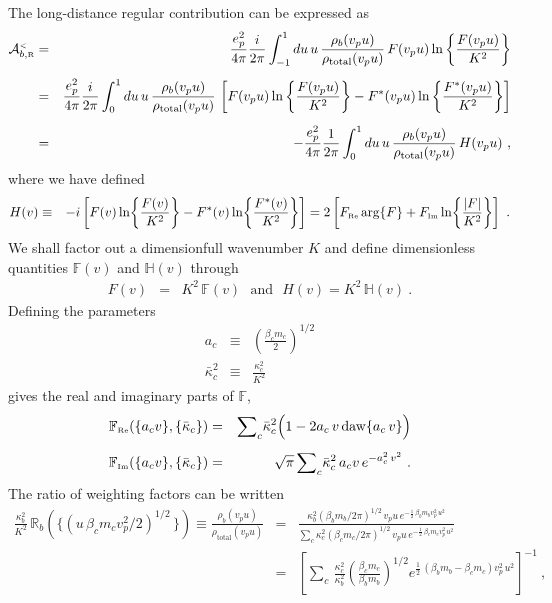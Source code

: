 \documentclass[preprint,12pt,eqsecnum,nofootinbib,amsmath,amssymb]{revtex4}
\newcommand{\smR}{{\rm\scriptscriptstyle R}}
\newcommand{\smRe}{{\rm\scriptscriptstyle Re}}
\newcommand{\smIm}{{\rm\scriptscriptstyle Im}}
\newcommand{\smLT}{{\rm\scriptscriptstyle <}}
\begin{document}
The long-distance regular contribution can be expressed as
\begin{eqnarray}
  {\cal A}^\smLT_{b,\smR} 
  &=&
  \frac{e_p^2}{4\pi}
  \frac{i}{2\pi} \int_{-1}^1 du\,u\,
  \frac{\rho_b(v_p u)}{\rho_\text{total}(v_p u)}\,
  F(v_p u) \ln \left\{ \frac{F(v_p u)}{K^2} \right\}
\\[5pt]
  &=&
  \frac{e_p^2}{4\pi}
  \frac{i}{2\pi} \int_0^1 du\,u\,
  \frac{\rho_b(v_p u)}{\rho_\text{total}(v_p u)}\,
  \left[
  F(v_p u) \ln \left\{ \frac{F(v_p u)}{K^2} \right\}
  -
  F^*(v_p u) \ln \left\{ \frac{F^*(v_p u)}{K^2} \right\}
  \right]
\\[5pt]
  &=&
  -\frac{e_p^2}{4\pi}
  \frac{1}{2\pi} \int_0^1 du\,u\,
  \frac{\rho_b(v_p u)}{\rho_\text{total}(v_p u)}\, H(v_p u) \ ,
\end{eqnarray}
where we have defined
\begin{eqnarray}
  H(v) 
  &\equiv&
  -i\left[
  F(v) \ln\!\left\{ \frac{F(v)}{K^2}\right\} -
  F^*(v)\ln\!\left\{\frac{F^*(v)}{K^2} \right\}\right]
  =
  2\left[
  F_\smRe\, {\rm arg}\{F\}
  +
  F_{\smIm} \ln\!\left\{\frac{\vert F \vert}{K^2}\right\}
   \right] \ .
\nonumber\\
\label{Hbagain}
\end{eqnarray}
We shall factor out a dimensionfull wavenumber $K$ and define
dimensionless quantities $\mathbb{F}(v)$ and $\mathbb{H}(v)$
through
\begin{eqnarray}
  F(v) &=& K^2\,  \mathbb{F}(v) 
  ~~~\text{and}~~~
  H(v) = K^2\,  \mathbb{H}(v) \ .
\end{eqnarray}
Defining the parameters
\begin{eqnarray}
  a_c
  &\equiv&
  \left(\frac{\beta_c m_c}{2} \right)^{1/2}
\\[5pt]
  \bar\kappa_c^2 
  &\equiv &
  \frac{\kappa_c^2}{K^2} 
\end{eqnarray}
gives the real and imaginary parts of $\mathbb{F}$, 
\begin{eqnarray}
  \mathbb{F}_\smRe(\{a_c v\},\{\bar\kappa_c\}) &=& 
  {\sum}_c \bar\kappa_c^2 \Big(1 - 2 a_c\, v\,{\rm daw}\{a_c\, v\}\Big)
\label{defFreA}
\\[5pt]
  \mathbb{F}_\smIm(\{a_c v\},\{\bar\kappa_c\}) &=& 
  \sqrt{\pi}\,{\sum}_c \bar\kappa_c^2\,a_c v\, e^{-a_c^2\, v^2} \ .
\label{defFimA}
\end{eqnarray}
The ratio of weighting factors can be written
\begin{eqnarray}
  \frac{\kappa_b^2}{K^2}\,
  \mathbb{R}_b(\{ (u\,\beta_c m_c v_p^2/2)^{1/2}\, \}) \equiv
  \frac{\rho_b(v_p u)}{\rho_\text{total}(v_p u)}
  &=&
  \frac{
  \kappa_b^2 \left(\beta_b m_b/2\pi\right)^{1/2} \,v_p u\,
  e^{-\frac{1}{2}\,\beta_b m_b v_p^2\, u^2}}
  {{\sum}_c\kappa_c^2 \left(\beta_c m_c/2\pi\right)^{1/2} 
  \, v_p u\,  e^{-\frac{1}{2}\,\beta_c m_c v_p^2\, u^2}}
\\[5pt]
  &=&
  \left[
  {\sum}_c \, \frac{\kappa_c^2}{\kappa_b^2} 
  \left(\frac{\beta_c m_c}{\beta_b m_b}\right)^{1/2} 
  e^{\frac{1}{2}\,(\beta_b m_b-\beta_c m_c) v_p^2\, u^2}
  \right]^{-1} \ ,
\nonumber \\ 
\end{eqnarray}
\end{document}
